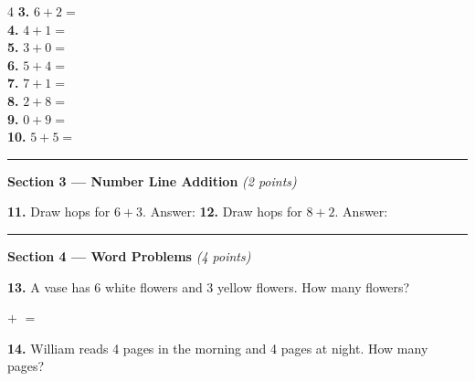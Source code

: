 \documentclass[12pt, letterpaper]{article}
\newcommand{\answerline}{\underline{\hspace{2.5cm}}}
\newcommand{\numbox}{\fbox{\hspace{0.6cm}\vphantom{0}}}
\begin{document}
\bigskip
\begin{multicols}{4}
\noindent\textbf{3.} $6+2=$ \numbox\\[10pt]
\noindent\textbf{4.} $4+1=$ \numbox\\

\columnbreak
\noindent\textbf{5.} $3+0=$ \numbox\\[10pt]
\noindent\textbf{6.} $5+4=$ \numbox\\

\columnbreak
\noindent\textbf{7.} $7+1=$ \numbox\\[10pt]
\noindent\textbf{8.} $2+8=$ \numbox\\

\columnbreak
\noindent\textbf{9.} $0+9=$ \numbox\\[10pt]
\noindent\textbf{10.} $5+5=$ \numbox\\
\end{multicols}

\bigskip
\noindent\textcolor{scholared}{\rule{\linewidth}{0.4pt}}

\noindent\textcolor{scholared}{\large\textbf{Section 3 — Number Line Addition}} \hfill \textit{(2 points)}

\begin{center}
\end{center}

\noindent\textbf{11.} Draw hops for $6+3$. Answer: \hfill \answerline \hspace{2cm}
\textbf{12.} Draw hops for $8+2$. Answer: \hfill \answerline

\bigskip
\noindent\textcolor{scholared}{\rule{\linewidth}{0.4pt}}

\noindent\textcolor{scholared}{\large\textbf{Section 4 — Word Problems}} \hfill \textit{(4 points)}

\bigskip
\noindent\textbf{13.} A vase has 6 white flowers and 3 yellow flowers. How many flowers? 

\medskip
\hspace{2em} \numbox \; $+$ \; \numbox \; $=$ \; \numbox

\bigskip
\noindent\textbf{14.} William reads 4 pages in the morning and 4 pages at night. How many pages?
\end{document}
